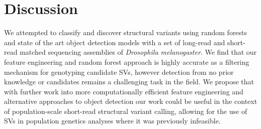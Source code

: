 \section{Discussion}

We attempted to classify and discover structural variants using random forests and state of the art object detection models with a set of long-read and short-read matched sequencing assemblies of \textit{Drosophila melanogaster}. We find that our feature engineering and random forest approach is highly accurate as a filtering mechanism for genotyping candidate SVs, however detection from no prior knowledge or candidates remains a challenging task in the field. We propose that with further work into more computationally efficient feature engineering and alternative approaches to object detection our work could be useful in the context of population-scale short-read structural variant calling, allowing for the use of SVs in population genetics analyses where it was previously infeasible. 